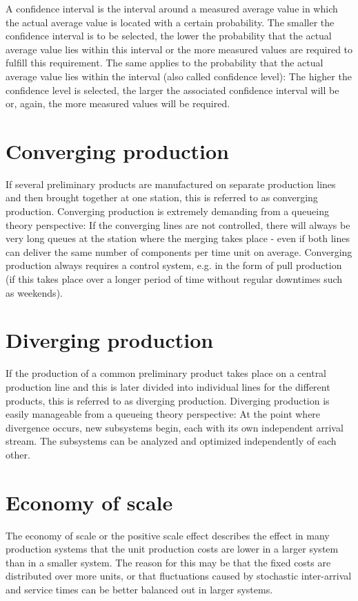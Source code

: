 A confidence interval is the interval around a measured average value in which the actual
average value is located with a certain probability. The smaller the confidence interval
is to be selected, the lower the probability that the actual average value lies within
this interval or the more measured values are required to fulfill this requirement. The
same applies to the probability that the actual average value lies within the interval
(also called confidence level): The higher the confidence level is selected, the larger the
associated confidence interval will be or, again, the more measured values will be required.

\section*{Converging production}


If several preliminary products are manufactured on separate production lines and
then brought together at one station, this is referred to as converging production.
Converging production is extremely demanding from a queueing theory perspective:
If the converging lines are not controlled, there will always be very long queues
at the station where the merging takes place - even if both lines can deliver the
same number of components per time unit on average. Converging production always
requires a control system, e.g. in the form of pull production
(if this takes place over a longer period of time without regular downtimes such as weekends).

\section*{Diverging production}


If the production of a common preliminary product takes place on a central production line
and this is later divided into individual lines for the different products, this is referred
to as diverging production. Diverging production is easily manageable from a queueing theory
perspective: At the point where divergence occurs, new subsystems begin, each with its own
independent arrival stream. The subsystems can be analyzed and optimized independently of each other.

\section*{Economy of scale}


The economy of scale or the positive scale effect describes the effect in many production systems
that the unit production costs are lower in a larger system than in a smaller system.
The reason for this may be that the fixed costs are distributed over more units, or that fluctuations
caused by stochastic inter-arrival and service times can be better balanced out in larger systems.

